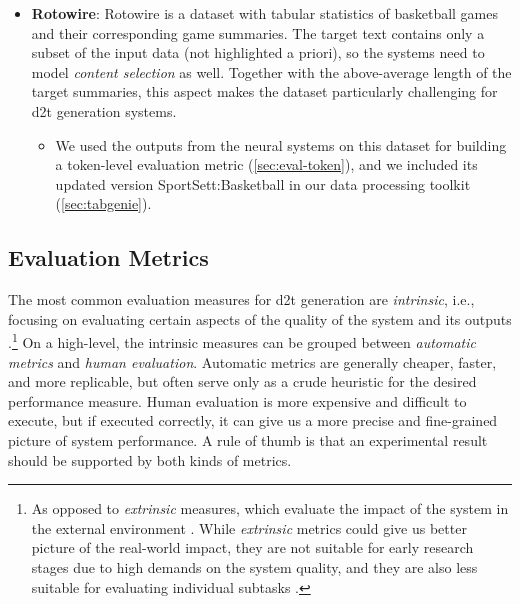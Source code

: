 \begin{itemize}
    \item \textbf{Rotowire}: Rotowire \cite{wiseman2017challenges} is a dataset with tabular statistics of basketball games and their corresponding game summaries. The target text contains only a subset of the input data (not highlighted a priori), so the systems need to model \emph{content selection} as well. Together with the above-average length of the target summaries, this aspect makes the dataset particularly challenging for \ac{d2t} generation systems.
          \begin{itemize}
              \item
                    We used the outputs from the neural systems on this dataset for building a token-level evaluation metric (\autoref{sec:eval-token}), and we included its updated version SportSett:Basketball \cite{thomson2020sportsett} in our data processing toolkit (\autoref{sec:tabgenie}).
          \end{itemize}
\end{itemize}



\subsection{Evaluation Metrics}
\label{sec:evaluation}

The most common evaluation measures for \ac{d2t} generation are \emph{intrinsic}, i.e., focusing on evaluating certain aspects of the quality of the system and its outputs \cite{gkatzia2015snapshot,celikyilmazEvaluationTextGeneration2021}.\footnote{As opposed to \emph{extrinsic} measures, which evaluate the impact of the system in the external environment \cite{celikyilmazEvaluationTextGeneration2021}. While \emph{extrinsic} metrics could give us better picture of the real-world impact, they are not suitable for early research stages due to high demands on the system quality, and they are also less suitable for evaluating individual subtasks \cite{van2019best}.} On a high-level, the intrinsic measures can be grouped between \emph{automatic metrics} and \emph{human evaluation}. Automatic metrics are generally cheaper, faster, and more replicable, but often serve only as a crude heuristic for the desired performance measure. Human evaluation is more expensive and difficult to execute, but if executed correctly, it can give us a more precise and fine-grained picture of system performance. A rule of thumb is that an experimental result should be supported by both kinds of metrics.


